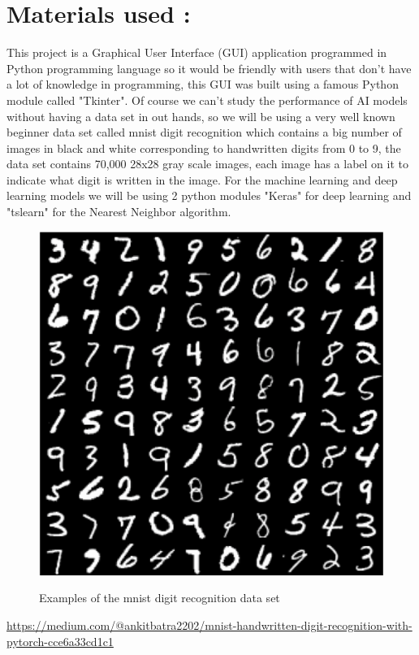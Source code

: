 \documentclass[10pt,a4paper]{article}
\begin{document}
\section{Materials used :}
\large This project is a Graphical User Interface (GUI) application programmed in Python programming language so it would be friendly with users that don't have a lot of knowledge in programming, this GUI was built using a famous Python module called "Tkinter". Of course we can't study the performance of AI models without having a data set in out hands, so we will be using a very well known beginner data set called mnist digit recognition which contains a big number of images in black and white corresponding to handwritten digits from 0 to 9, the data set contains 70,000 28x28 gray scale images, each image has a label on it to indicate what digit is written in the image. For the machine learning and deep learning models we will be using 2 python modules "Keras" for deep learning and "tslearn" for the Nearest Neighbor algorithm.

\begin{figure}[H]
\centering
\includegraphics[scale=0.5]{mnist.png}\\
\caption{Examples of the mnist digit recognition data set}
\end{figure}
\begin{center}
\textcolor{blue}{\small\url {https://medium.com/@ankitbatra2202/mnist-handwritten-digit-recognition-with-pytorch-cce6a33cd1c1}}
\end{center}
\end{document}

